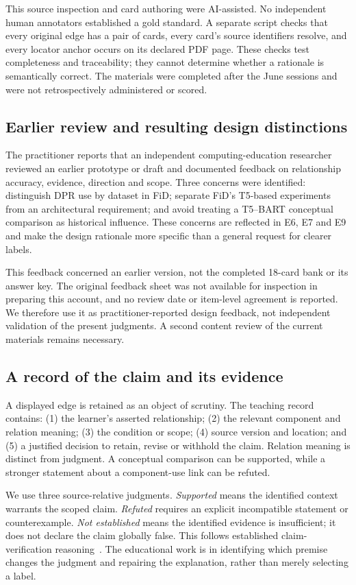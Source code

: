 This source inspection and card authoring were AI-assisted. No independent human annotators established a gold standard. A separate script checks that every original edge has a pair of cards, every card's source identifiers resolve, and every locator anchor occurs on its declared PDF page. These checks test completeness and traceability; they cannot determine whether a rationale is semantically correct. The materials were completed after the June sessions and were not retrospectively administered or scored.

\subsection{Earlier review and resulting design distinctions}
The practitioner reports that an independent computing-education researcher reviewed an earlier prototype or draft and documented feedback on relationship accuracy, evidence, direction and scope. Three concerns were identified: distinguish DPR use by dataset in FiD; separate FiD's T5-based experiments from an architectural requirement; and avoid treating a T5--BART conceptual comparison as historical influence. These concerns are reflected in E6, E7 and E9 and make the design rationale more specific than a general request for clearer labels.

This feedback concerned an earlier version, not the completed 18-card bank or its answer key. The original feedback sheet was not available for inspection in preparing this account, and no review date or item-level agreement is reported. We therefore use it as practitioner-reported design feedback, not independent validation of the present judgments. A second content review of the current materials remains necessary.

\subsection{A record of the claim and its evidence}
A displayed edge is retained as an object of scrutiny. The teaching record contains: (1) the learner's asserted relationship; (2) the relevant component and relation meaning; (3) the condition or scope; (4) source version and location; and (5) a justified decision to retain, revise or withhold the claim. Relation meaning is distinct from judgment. A conceptual comparison can be supported, while a stronger statement about a component-use link can be refuted.

We use three source-relative judgments. \emph{Supported} means the identified context warrants the scoped claim. \emph{Refuted} requires an explicit incompatible statement or counterexample. \emph{Not established} means the identified evidence is insufficient; it does not declare the claim globally false. This follows established claim-verification reasoning~\cite{scifact}. The educational work is in identifying which premise changes the judgment and repairing the explanation, rather than merely selecting a label.

